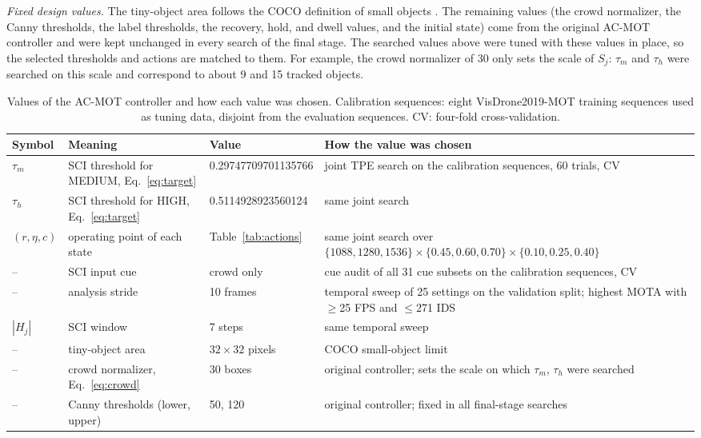 \documentclass[pdflatex,sn-mathphys-num,iicol]{sn-jnl}
\begin{document}
\emph{Fixed design values.} The tiny-object area follows the COCO definition
of small objects \cite{lin2014coco}. The remaining values (the crowd
normalizer, the Canny thresholds, the label thresholds, the recovery, hold,
and dwell values, and the initial state) come from the original AC-MOT
controller and were kept unchanged in every search of the final stage. The
searched values above
were tuned with these values in place, so the selected thresholds and actions
are matched to them. For example, the crowd normalizer of 30 only sets the
scale of $S_j$: $\tau_m$ and $\tau_h$ were searched on this scale and
correspond to about 9 and 15 tracked objects.

\begin{table}[t]
\caption{Values of the AC-MOT controller and how each value was chosen.
Calibration sequences: eight VisDrone2019-MOT training sequences used as
tuning data, disjoint from the evaluation sequences. CV: four-fold
cross-validation.}
\label{tab:constants}
\centering\footnotesize
\setlength{\tabcolsep}{4pt}
\begin{tabular}{@{}l>{\raggedright\arraybackslash}p{50mm}l>{\raggedright\arraybackslash}p{62mm}@{}}
\toprule
Symbol & Meaning & Value & How the value was chosen\\
\midrule
$\tau_m$ & SCI threshold for MEDIUM, Eq.~\eqref{eq:target} & 0.29747709701135766 & joint TPE search on the calibration sequences, 60 trials, CV\\
$\tau_h$ & SCI threshold for HIGH, Eq.~\eqref{eq:target} & 0.5114928923560124 & same joint search\\
$(r,\eta,c)$ & operating point of each state & Table~\ref{tab:actions} & same joint search over $\{1088,1280,1536\}\times\{0.45,0.60,0.70\}\times\{0.10,0.25,0.40\}$\\
-- & SCI input cue & crowd only & cue audit of all 31 cue subsets on the calibration sequences, CV\\
-- & analysis stride & 10 frames & temporal sweep of 25 settings on the validation split; highest MOTA with $\geq$25 FPS and $\leq$271 IDS\\
$|H_j|$ & SCI window & 7 steps & same temporal sweep\\
-- & tiny-object area & $32\times32$ pixels & COCO small-object limit \cite{lin2014coco}\\
-- & crowd normalizer, Eq.~\eqref{eq:crowd} & 30 boxes & original controller; sets the scale on which $\tau_m$, $\tau_h$ were searched\\
-- & Canny thresholds (lower, upper) & 50, 120 & original controller; fixed in all final-stage searches\\

\end{tabular}
\end{table}
\end{document}
